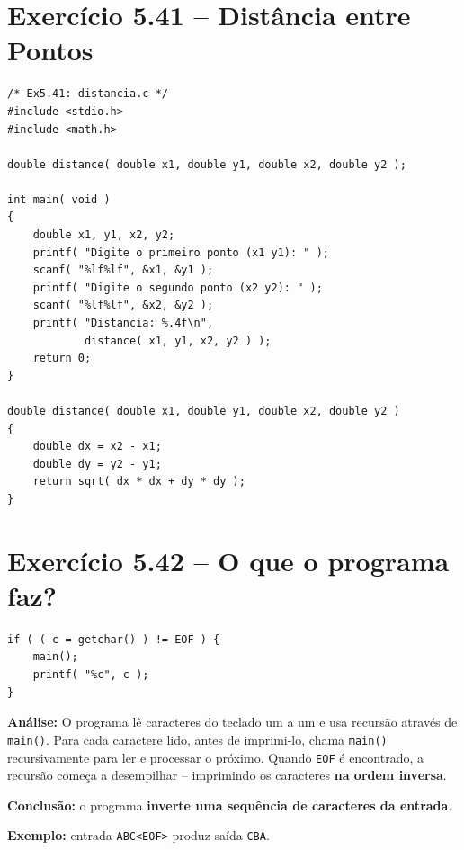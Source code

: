 \documentclass[12pt,a4paper]{article}
\begin{document}
\section{Exercício 5.41 -- Distância entre Pontos}

\begin{respostabox}
\begin{lstlisting}
/* Ex5.41: distancia.c */
#include <stdio.h>
#include <math.h>

double distance( double x1, double y1, double x2, double y2 );

int main( void )
{
    double x1, y1, x2, y2;
    printf( "Digite o primeiro ponto (x1 y1): " );
    scanf( "%lf%lf", &x1, &y1 );
    printf( "Digite o segundo ponto (x2 y2): " );
    scanf( "%lf%lf", &x2, &y2 );
    printf( "Distancia: %.4f\n",
            distance( x1, y1, x2, y2 ) );
    return 0;
}

double distance( double x1, double y1, double x2, double y2 )
{
    double dx = x2 - x1;
    double dy = y2 - y1;
    return sqrt( dx * dx + dy * dy );
}
\end{lstlisting}
\end{respostabox}

\newpage

\section{Exercício 5.42 -- O que o programa faz?}

\begin{respostabox}
\begin{lstlisting}
if ( ( c = getchar() ) != EOF ) {
    main();
    printf( "%c", c );
}
\end{lstlisting}

\textbf{Análise:} O programa lê caracteres do teclado um a um e usa recursão
através de \texttt{main()}. Para cada caractere lido, antes de imprimi-lo, chama
\texttt{main()} recursivamente para ler e processar o próximo. Quando \texttt{EOF}
é encontrado, a recursão começa a desempilhar -- imprimindo os caracteres
\textbf{na ordem inversa}.

\textbf{Conclusão:} o programa \textbf{inverte uma sequência de caracteres da entrada}.

\textbf{Exemplo:} entrada \texttt{ABC<EOF>} produz saída \texttt{CBA}.
\end{respostabox}
\end{document}
